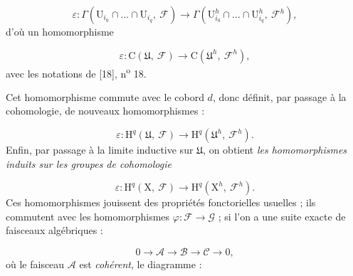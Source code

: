 \begin{equation*}
\varepsilon : \Gamma(\mathrm{U}_{i_0} \cap \ldots \cap \mathrm{U}_{i_q}, \ \mathcal{F}) \to \Gamma(\mathrm{U}^h_{i_0} \cap \ldots \cap \mathrm{U}^h_{i_q}, \ \mathcal{F}^h),
\end{equation*}
d'où un homomorphisme

\begin{equation*}
\varepsilon : \mathrm{C}(\mathfrak{U}, \ \mathcal{F}) \to \mathrm{C}(\mathfrak{U}^h, \ \mathcal{F}^h),
\end{equation*}
avec les notations de [18], n\textsuperscript{o} 18.



Cet homomorphisme commute avec le cobord $d$, donc définit, par passage à la cohomologie, de nouveaux homomorphismes :

\begin{equation*}
\varepsilon : \mathrm{H}^q(\mathfrak{U},\ \mathcal{F}) \longrightarrow \mathrm{H}^q(\mathfrak{U}^h,\ \mathcal{F}^h).
\end{equation*}
Enfin, par passage à la limite inductive sur $\mathfrak{U}$, on obtient \textit{les homomorphismes induits sur les groupes de cohomologie}

\begin{equation*}
\varepsilon : \mathrm{H}^q(\mathrm{X},\ \mathcal{F}) \longrightarrow \mathrm{H}^q(\mathrm{X}^h,\ \mathcal{F}^h).
\end{equation*}
Ces homomorphismes jouissent des propriétés fonctorielles usuelles ; ils commutent avec les homomorphismes $\varphi : \mathcal{F} \longrightarrow \mathcal{G}$ ; si l'on a une suite exacte de faisceaux algébriques :

\begin{equation*}
0 \longrightarrow \mathcal{A} \longrightarrow \mathcal{B} \longrightarrow \mathcal{C} \longrightarrow 0,
\end{equation*}
où le faisceau $\mathcal{A}$ est \textit{cohérent}, le diagramme :

